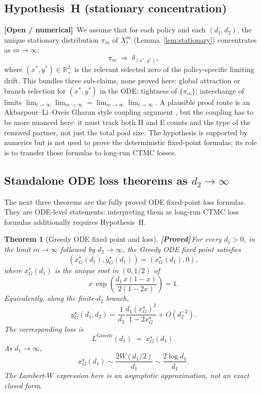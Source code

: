 \documentclass{article}
\theoremstyle{plain}
\newtheorem{theorem}{Theorem}
\theoremstyle{definition}
\newcommand{\proved}{\textcolor{provedgreen}{\textbf{[Proved]}}\,}
\newcommand{\open}{\textcolor{openred}{\textbf{[Open / numerical]}}\,}
\begin{document}
\subsection{Hypothesis~H (stationary concentration)}\label{ssec:hypH}

\open
We assume that for each policy and each $(d_1,d_2)$, the unique stationary distribution $\pi_m$ of $X^m_t$ (Lemma~\ref{lem:stationary}) concentrates as $m\to\infty$:
\[
\pi_m \;\Longrightarrow\; \delta_{(x^\ast,y^\ast)},
\]
where $(x^\ast,y^\ast)\in\mathbb{R}_+^2$ is the relevant selected zero of the policy-specific limiting drift. This bundles three sub-claims, none proved here: global attraction or branch selection for $(x^\ast,y^\ast)$ in the ODE; tightness of $\{\pi_m\}$; interchange of limits $\lim_{t\to\infty}\lim_{m\to\infty}=\lim_{m\to\infty}\lim_{t\to\infty}$. A plausible proof route is an Akbarpour--Li--Oveis Gharan style coupling argument \cite{akbarpour}, but the coupling has to be more nuanced here: it must track both H and E counts and the type of the removed partner, not just the total pool size. The hypothesis is supported by numerics but is not used to prove the deterministic fixed-point formulas; its role is to transfer those formulas to long-run CTMC losses.

\subsection{Standalone ODE loss theorems as $d_2\to\infty$}\label{ssec:results-d2inf}

The next three theorems are the fully proved ODE fixed-point loss formulas. They are ODE-level statements: interpreting them as long-run CTMC loss formulas additionally requires Hypothesis~H.

\begin{theorem}[Greedy ODE fixed point and loss]\label{thm:greedy-ode-loss}
\proved For every $d_1>0$, in the limit $m\to\infty$ followed by $d_2\to\infty$, the Greedy ODE fixed point satisfies
\[
(x^\star_G(d_1),y^\star_G(d_1))=(x^\star_G(d_1),0),
\]
where $x^\star_G(d_1)$ is the unique root in $(0,1/2)$ of
\[
x\,\exp\!\left(\frac{d_1\,x(1-x)}{2(1-2x)}\right)=1.
\]
Equivalently, along the finite-$d_2$ branch,
\[
y^\star_G(d_1,d_2)=\frac{1}{d_2}\frac{d_1(x^\star_G)^2}{1-2x^\star_G}+O(d_2^{-2}).
\]
The corresponding loss is
\begin{equation}\label{eq:LG}
L^{\text{Greedy}}(d_1) \;=\; x^\star_G(d_1).
\end{equation}
As $d_1\to\infty$,
\[
x^\star_G(d_1)
\sim \frac{2W(d_1/2)}{d_1}
\sim \frac{2\log d_1}{d_1}.
\]
The Lambert-$W$ expression here is an asymptotic approximation, not an exact closed form.
\end{theorem}
\end{document}
